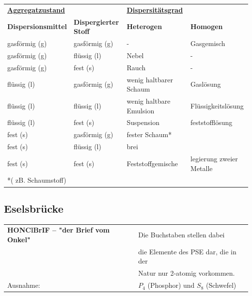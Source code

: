 {\footnotesize
	\begin{tabular}[\columnwidth]{l l | l l}
		\underline{\textbf{Aggregatzustand}} &                              & \underline{\textbf{Dispersitätsgrad}} &                          \\
		\textbf{Dispersionsmittel}           & \textbf{Dispergierter Stoff} & \textbf{Heterogen}                    & \textbf{Homogen}         \\
		gasförmig (g)                        & gasförmig (g)                & -                                     & Gasgemisch               \\
		gasförmig (g)                        & flüssig (l)                  & Nebel                                 & -                        \\
		gasförmig (g)                        & fest (s)                     & Rauch                                 & -                        \\
		flüssig (l)                          & gasförmig (g)                & wenig haltbarer Schaum                & Gaslösung                \\
		flüssig (l)                          & flüssig (l)                  & wenig haltbare Emulsion               & Flüssigkeitslösung       \\
		flüssig (l)                          & fest (s)                     & Suspension                            & feststofflösung          \\
		fest (s)                             & gasförmig (g)                & fester Schaum*                        &                          \\
		fest (s)                             & flüssig (l)                  & brei                                  &                          \\
		fest (s)                             & fest (s)                     & Feststoffgemische                     & legierung zweier Metalle \\
		*( zB. Schaumstoff)                  &                              &                                       &
	\end{tabular} 
}
		
\subsection{Eselsbrücke}
\small{
\begin{tabular}{ll} 
	\textbf{HONClBrIF – "der Brief vom Onkel"}   &  Die Buchstaben stellen dabei \\
	& die Elemente des PSE dar, die in der \\
	& Natur nur 2-atomig vorkommen. \\ 
	\hline
	Ausnahme: & $P_4$ (Phosphor) und $S_8$ (Schwefel)  \\
\end{tabular}
}

